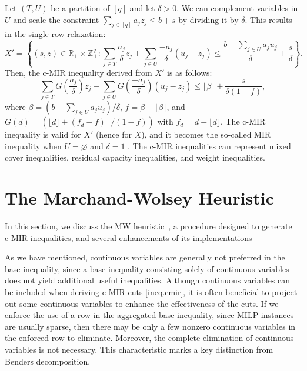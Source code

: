 \documentclass[a4paper,UKenglish,cleveref, autoref,  thm-restate]{lipics-v2021}
\newcommand{\bR}{\mathbb{R}}
\newcommand{\bZ}{\mathbb{Z}}
\newcommand{\floor}[1]{\lfloor #1 \rfloor}
\begin{document}
	
	Let \( (T, U) \) be a partition of \( [q] \) and let \( \delta > 0 \). We can complement variables in \( U \) and scale the constraint $\sum_{j \in [q]} a_j z_j \leq b + s$  by dividing it by \( \delta \). This results in the single-row relaxation:
	\begin{equation}
		\label{eq.mks2}
		X' = \left\{ (s,z) \in \bR_+ \times \bZ_+^q : \sum_{j \in T} \frac{a_j}{\delta} z_j + \sum_{j \in U} \frac{-a_j}{\delta} (u_j - z_j) \leq  \frac{b - \sum_{j \in U} a_j u_j}{\delta} + \frac{s}{\delta} \right\}.
	\end{equation}
	Then, the c-MIR inequality derived from $X'$ is as follows:
	\begin{equation}
		\label{ineq.cmir}
		\sum_{j \in T} G(\frac{a_j}{\delta}) z_j + \sum_{j \in U} G(\frac{-a_j}{\delta}) (u_j - z_j) \leq \floor{\beta}  + \frac{s}{\delta (1-f)},
	\end{equation}
	where $
	\beta = (b - \sum_{j \in U} a_j u_j) / \delta$, $f = \beta - \lfloor \beta \rfloor$,
	and
	$
	G(d) = (\lfloor d \rfloor + (f_d - f)^+ / (1 - f)) \text{ with } f_d = d - \lfloor d \rfloor$.
	The c-MIR inequality is valid for $X'$ (hence for $X$), and it becomes the so-called MIR inequality when $U = \varnothing$  and $\delta = 1$ \cite{marchand2001aggregation,nemhauser1990recursive}.   The c-MIR inequalities can represent mixed cover inequalities, residual capacity inequalities, and weight inequalities.
	
	
	\section{The Marchand-Wolsey Heuristic} \label{sec.mw}
	In this section, we discuss the MW heuristic~\cite{marchand2001aggregation}, a procedure designed to generate c-MIR inequalities, and several enhancements of its implementations \cite{christophel2009separation,wolter2006implementation}
	
	
	
	
	As we have mentioned, continuous variables are generally not preferred in the base inequality, since a base inequality consisting solely of continuous variables does not yield additional useful inequalities.  Although continuous variables can be included when deriving c-MIR cuts \eqref{ineq.cmir}, it is often beneficial to project out some continuous variables to enhance the effectiveness of the cuts. If we enforce the use of a row in the aggregated base inequality, since MILP instances are usually sparse, then there may  be only a few nonzero continuous variables in the enforced row to eliminate. Moreover, the complete elimination of continuous variables is not necessary. This characteristic marks a key distinction from Benders decomposition.
	
\end{document}
